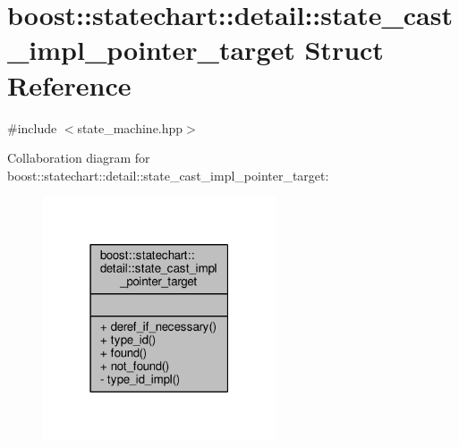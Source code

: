 \hypertarget{structboost_1_1statechart_1_1detail_1_1state__cast__impl__pointer__target}{}\section{boost\+:\+:statechart\+:\+:detail\+:\+:state\+\_\+cast\+\_\+impl\+\_\+pointer\+\_\+target Struct Reference}
\label{structboost_1_1statechart_1_1detail_1_1state__cast__impl__pointer__target}


{\ttfamily \#include $<$state\+\_\+machine.\+hpp$>$}



Collaboration diagram for boost\+:\+:statechart\+:\+:detail\+:\+:state\+\_\+cast\+\_\+impl\+\_\+pointer\+\_\+target\+:
\nopagebreak
\begin{figure}[H]
\begin{center}
\leavevmode
\includegraphics[width=195pt]{structboost_1_1statechart_1_1detail_1_1state__cast__impl__pointer__target__coll__graph}
\end{center}
\end{figure}
